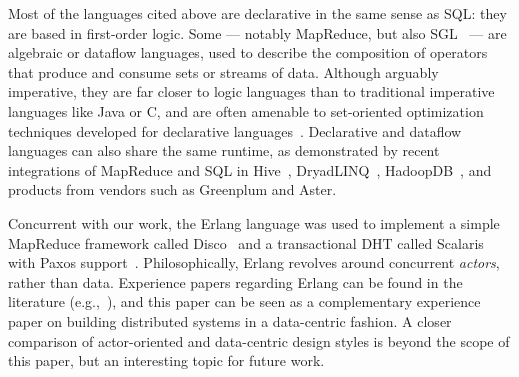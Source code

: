 Most of the languages cited above are declarative in the same sense as SQL: they are based in first-order logic.
Some --- notably MapReduce, but also SGL~\cite{cornellgames} --- are
algebraic or dataflow languages, used to describe the
composition of operators that produce and consume sets
or streams of data.  Although arguably imperative, they are far closer
to logic languages than to traditional imperative languages like Java
or C, and are often amenable to set-oriented optimization techniques developed for declarative languages~\cite{cornellgames}.
Declarative and dataflow languages can also share the same runtime, as
demonstrated by recent integrations of MapReduce and SQL
in Hive~\cite{hive}, DryadLINQ~\cite{DryadLINQ},
HadoopDB~\cite{hadoopdb}, and products from vendors such as Greenplum and Aster.

Concurrent with our work, the Erlang language was used to implement a simple MapReduce framework called Disco~\cite{disco} and a transactional DHT called Scalaris with Paxos support~\cite{scalaris}.
Philosophically, Erlang revolves around concurrent {\em actors}, rather than
data.  Experience papers regarding Erlang can be found in the literature (e.g.,~\cite{armistice}), and this paper can be seen as a complementary experience paper on building distributed systems in a data-centric fashion.  A closer comparison of actor-oriented and data-centric design styles is beyond the scope of this paper, but an interesting topic for future work.


